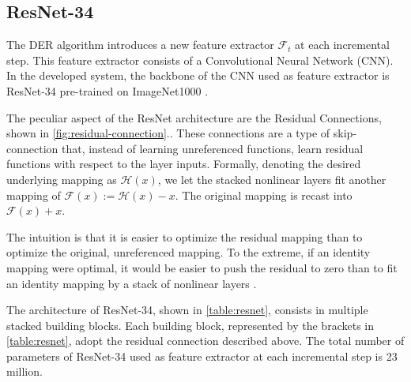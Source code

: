 \subsection{ResNet-34}
The DER algorithm introduces a new feature extractor $\mathcal{F}_t$ at each incremental step. This feature extractor consists of a Convolutional Neural Network (CNN). In the developed system, the backbone of the CNN used as feature extractor is ResNet-34 \cite{he2016deep} pre-trained on ImageNet1000 \cite{deng2009imagenet}.

The peculiar aspect of the ResNet architecture are the Residual Connections, shown in \autoref{fig:residual-connection}.. These connections are a type of skip-connection that, instead of learning unreferenced functions, learn residual functions with respect to the layer inputs. Formally, denoting the desired underlying mapping as $\mathcal{H}(x)$, we let the stacked nonlinear layers fit another mapping of $\mathcal{F}(x) := \mathcal{H}(x) - x$. The original mapping is recast into $\mathcal{F}(x) + x$. 

The intuition is that it is easier to optimize the residual mapping than to optimize the original, unreferenced mapping. To the extreme, if an identity mapping were optimal, it would be easier to push the residual to zero than to fit an identity mapping by a stack of nonlinear layers \cite{he2016deep}.

The architecture of ResNet-34, shown in \autoref{table:resnet}, consists in multiple stacked building blocks. Each building block, represented by the brackets in \autoref{table:resnet}, adopt the residual connection described above. The total number of parameters of ResNet-34 used as feature extractor at each incremental step is 23 million.

